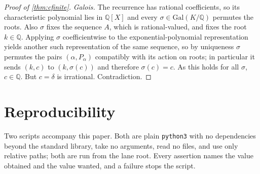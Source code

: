 \documentclass[11pt]{amsart}
\theoremstyle{definition}
\theoremstyle{remark}
\begin{document}
\begin{proof}[Proof of \cref{thm:cfinite}]
\emph{Galois.} The recurrence has rational coefficients, so its characteristic polynomial lies in $\mathbb{Q}[X]$ and every $\sigma \in \mathrm{Gal}(K/\mathbb{Q})$ permutes the roots. Also $\sigma$ fixes the sequence $A$, which is rational-valued, and fixes the root $k \in \mathbb{Q}$. Applying $\sigma$ coefficientwise to the exponential-polynomial representation yields another such representation of the same sequence, so by uniqueness $\sigma$ permutes the pairs $(\alpha, P_\alpha)$ compatibly with its action on roots; in particular it sends $(k, c)$ to $(k, \sigma(c))$ and therefore $\sigma(c) = c$. As this holds for all $\sigma$, $c \in \mathbb{Q}$. But $c = \delta$ is irrational. Contradiction.
\end{proof}

\section{Reproducibility}
\label{sec:repro}

Two scripts accompany this paper. Both are plain \texttt{python3} with no dependencies beyond the standard library, take no arguments, read no files, and use only relative paths; both are run from the lane root. Every assertion names the value obtained and the value wanted, and a failure stops the script.
\end{document}
